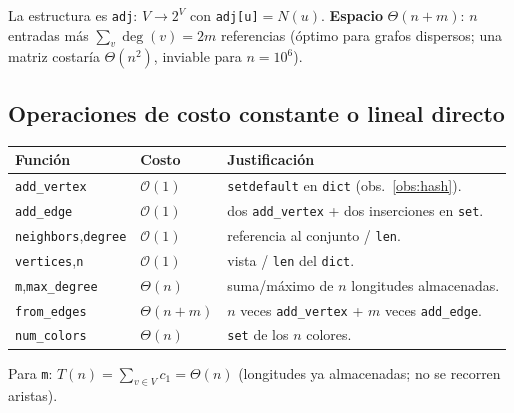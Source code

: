 \documentclass[11pt,a4paper]{article}
\theoremstyle{definition}
\theoremstyle{remark}
\newcommand{\dg}{\operatorname{deg}}
\newcommand{\bigO}{\mathcal{O}}
\begin{document}
La estructura es \texttt{adj}: $V\to 2^V$ con \texttt{adj[u]}$=N(u)$.
\textbf{Espacio} $\Theta(n+m)$: $n$ entradas más $\sum_v\dg(v)=2m$ referencias
(óptimo para grafos dispersos; una matriz costaría $\Theta(n^2)$, inviable para
$n=10^6$).

\subsection{Operaciones de costo constante o lineal directo}
\begin{center}
\begin{tabular}{@{}llp{7.4cm}@{}}
\toprule
\textbf{Función} & \textbf{Costo} & \textbf{Justificación}\\
\midrule
\texttt{add\_vertex} & $\bigO(1)$ & \texttt{setdefault} en \texttt{dict} (obs.~\ref{obs:hash}).\\
\texttt{add\_edge} & $\bigO(1)$ & dos \texttt{add\_vertex} + dos inserciones en \texttt{set}.\\
\texttt{neighbors},\texttt{degree} & $\bigO(1)$ & referencia al conjunto / \texttt{len}.\\
\texttt{vertices},\texttt{n} & $\bigO(1)$ & vista / \texttt{len} del \texttt{dict}.\\
\texttt{m},\texttt{max\_degree} & $\Theta(n)$ & suma/máximo de $n$ longitudes almacenadas.\\
\texttt{from\_edges} & $\Theta(n+m)$ & $n$ veces \texttt{add\_vertex} + $m$ veces \texttt{add\_edge}.\\
\texttt{num\_colors} & $\Theta(n)$ & \texttt{set} de los $n$ colores.\\
\bottomrule
\end{tabular}
\end{center}
Para \texttt{m}: $T(n)=\sum_{v\in V}c_1=\Theta(n)$ (longitudes ya almacenadas; no
se recorren aristas).
\end{document}
